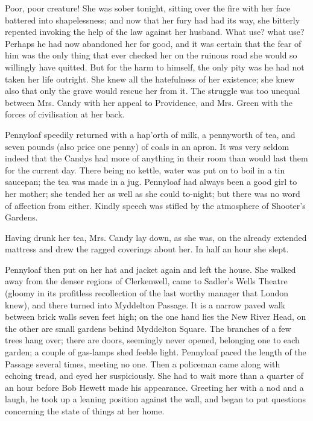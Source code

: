 Poor, poor creature! She was sober tonight, sitting over the fire with
her face battered into shapelessness; and now that her fury had had its
way, she bitterly repented invoking the help of the law against her
husband. What use? what use? Perhaps he had now abandoned her for good,
and it was certain that the fear of him was the only thing that ever
checked her on the ruinous road she would so willingly have quitted. But
for the harm to himself, the only pity was he had not taken her life
outright. She knew all the {}hatefulness of her existence; she knew also
that only the grave would rescue her from it. The struggle was too
unequal between Mrs. Candy with her appeal to Providence, and Mrs. Green
with the forces of civilisation at her back.

Pennyloaf speedily returned with a hap'orth of milk, a pennyworth of
tea, and seven pounds (also price one penny) of coals in an apron. It
was very seldom indeed that the Candys had more of anything in their
room than would last them for the current day. There being no kettle,
water was put on to boil in a tin saucepan; the tea was made in a jug.
Pennyloaf had always been a good girl to her mother; she tended her as
well as she could to-night; but there was no word of affection from
either. Kindly speech was stifled by the atmosphere of Shooter's
Gardens.

Having drunk her tea, Mrs. Candy lay down, as she was, on the already
extended mattress and drew the ragged coverings about her. In half an
hour she slept.

{}Pennyloaf then put on her hat and jacket again and left the house. She
walked away from the denser regions of Clerkenwell, came to Sadler's
Wells Theatre (gloomy in its profitless recollection of the last worthy
manager that London knew), and there turned into Myddelton Passage. It
is a narrow paved walk between brick walls seven feet high; on the one
hand lies the New River Head, on the other are small gardens behind
Myddelton Square. The branches of a few trees hang over; there are
doors, seemingly never opened, belonging one to each garden; a couple of
gas-lamps shed feeble light. Pennyloaf paced the length of the Passage
several times, meeting no one. Then a policeman came along with echoing
tread, and eyed her suspiciously. She had to wait more than a quarter of
an hour before Bob Hewett made his appearance. Greeting her with a nod
and a laugh, he took up a leaning position against the wall, and began
to put questions concerning the state of things at her home.

